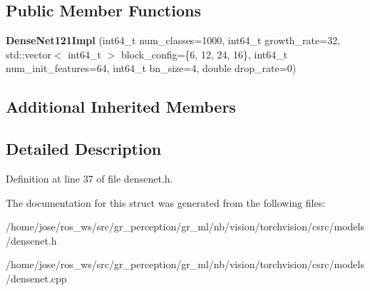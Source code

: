 \subsection*{Public Member Functions}
\begin{DoxyCompactItemize}
\item 
\mbox{\label{structvision_1_1models_1_1DenseNet121Impl_adcbc22e7af9b08b24c4ee469faba3dd8}} 
{\bfseries Dense\+Net121\+Impl} (int64\+\_\+t num\+\_\+classes=1000, int64\+\_\+t growth\+\_\+rate=32, std\+::vector$<$ int64\+\_\+t $>$ block\+\_\+config=\{6, 12, 24, 16\}, int64\+\_\+t num\+\_\+init\+\_\+features=64, int64\+\_\+t bn\+\_\+size=4, double drop\+\_\+rate=0)
\end{DoxyCompactItemize}
\subsection*{Additional Inherited Members}


\subsection{Detailed Description}


Definition at line 37 of file densenet.\+h.



The documentation for this struct was generated from the following files\+:\begin{DoxyCompactItemize}
\item 
/home/jose/ros\+\_\+ws/src/gr\+\_\+perception/gr\+\_\+ml/nb/vision/torchvision/csrc/models/densenet.\+h\item 
/home/jose/ros\+\_\+ws/src/gr\+\_\+perception/gr\+\_\+ml/nb/vision/torchvision/csrc/models/densenet.\+cpp\end{DoxyCompactItemize}
